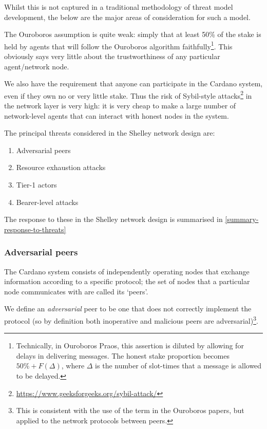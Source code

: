 \documentclass[11pt,a4paper]{article}
\begin{document}
Whilst this is not captured in a traditional methodology of threat model
development, the below are the major areas of consideration for such a
model.

The Ouroboros assumption is quite weak: simply that at least 50\% of the
stake is held by agents that will follow the Ouroboros algorithm
faithfully\footnote{Technically, in Ouroboros Praos, this assertion is
  diluted by allowing for delays in delivering messages. The honest
  stake proportion becomes $50\% + F(\Delta)$, where $\Delta$ is the number of
  slot-times that a message is allowed to be delayed.}. This obviously
says very little about the trustworthiness of any particular
agent/network node.

We also have the requirement that anyone can participate in the Cardano
system, even if they own no or very little stake. Thus the risk of
Sybil-style attacks\footnote{\href{https://www.geeksforgeeks.org/sybil-attack/}{{https://www.geeksforgeeks.org/sybil-attack/}}}
in the network layer is very high: it is very cheap to make a large
number of network-level agents that can interact with honest nodes in
the system.

The principal threats considered in the Shelley network design are:

\begin{enumerate}
\item
  Adversarial peers
\item
  Resource exhaustion attacks
\item
  Tier-1 actors
\item
  Bearer-level attacks
\end{enumerate}

The response to these in the Shelley network design is summarised in
\cref{summary-response-to-threats}

\subsubsection{Adversarial peers}
\label{adversarial-peers}

The Cardano system consists of independently operating nodes that
exchange information according to a specific protocol; the set of nodes
that a particular node communicates with are called its `peers'.

We define an \emph{adversarial} peer to be one that does not correctly
implement the protocol (so by definition both inoperative and malicious
peers are adversarial)\footnote{This is consistent with the use of the
  term in the Ouroboros papers, but applied to the network protocols
  between peers.}.
\end{document}
